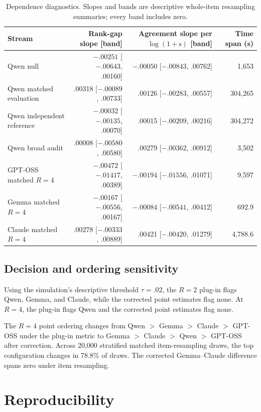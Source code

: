 \documentclass[letterpaper]{article}
\newcommand{\1}{\mathbf 1}
\begin{document}
\begin{table}[t]
\centering
\footnotesize
\setlength{\tabcolsep}{4pt}
\caption{Dependence diagnostics. Slopes and bands are descriptive whole-item
resampling summaries; every band includes zero.}
\label{tab:s-time-drift}
\begin{tabular}{lrrr}
\toprule
Stream & Rank-gap slope [band] &
Agreement slope per $\log(1+\mathrm{s})$ [band] & Time span (s) \\
\midrule
Qwen null
& $-.00251$ [$-.00643$, .00160]
& $-.00050$ [$-.00843$, .00762] & 1,653 \\
Qwen matched evaluation
& .00318 [$-.00089$, .00733]
& .00126 [$-.00283$, .00557] & 304,265 \\
Qwen independent reference
& $-.00032$ [$-.00135$, .00070]
& .00015 [$-.00209$, .00216] & 304,272 \\
Qwen broad audit
& .00008 [$-.00580$, .00580]
& .00279 [$-.00362$, .00912] & 3,502 \\
GPT-OSS matched $R=4$
& $-.00472$ [$-.01417$, .00389]
& $-.00194$ [$-.01556$, .01071] & 9,597 \\
Gemma matched $R=4$
& $-.00167$ [$-.00556$, .00167]
& $-.00084$ [$-.00541$, .00412] & 692.9 \\
Claude matched $R=4$
& .00278 [$-.00333$, .00889]
& .00421 [$-.00420$, .01279] & 4,788.6 \\
\bottomrule
\end{tabular}
\end{table}

\subsection{Decision and ordering sensitivity}

Using the simulation's descriptive threshold $\tau=.02$, the $R=2$ plug-in flags
Qwen, Gemma, and Claude, while the corrected point estimates flag none. At
$R=4$, the plug-in flags Qwen and the corrected point estimates flag none.

The $R=4$ point ordering changes from
Qwen $>$ Gemma $>$ Claude $>$ GPT-OSS under the plug-in metric to
Gemma $>$ Claude $>$ Qwen $>$ GPT-OSS after correction. Across 20,000
stratified matched item-resampling draws, the top configuration changes in
78.8\% of draws. The corrected Gemma--Claude difference spans zero under item
resampling.

\section{Reproducibility}
\end{document}
